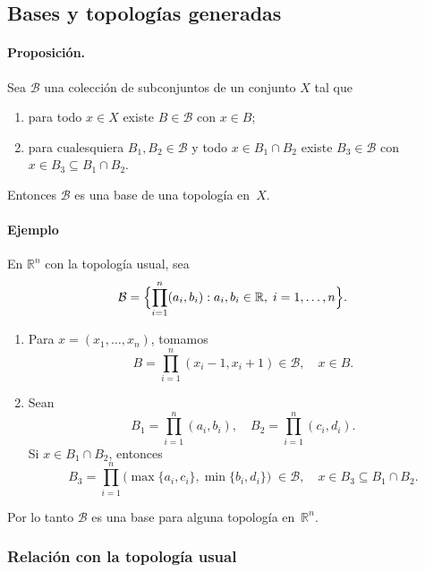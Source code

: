 \subsection{Bases y topologías generadas}

\paragraph{\textbf{Proposición.}}
Sea $\mathcal{B}$ una colección de subconjuntos de un conjunto $X$ tal que
\begin{enumerate}
  \item para todo $x\in X$ existe $B\in\mathcal{B}$ con $x\in B$;
  \item para cualesquiera $B_{1},B_{2}\in\mathcal{B}$ y todo $x\in B_{1}\cap B_{2}$
        existe $B_{3}\in\mathcal{B}$ con $x\in B_{3}\subseteq B_{1}\cap B_{2}$.
\end{enumerate}
Entonces $\mathcal{B}$ es una base de una topología en $X$.

\paragraph{\textbf{Ejemplo}}
En $\mathbb{R}^{n}$ con la topología usual, sea
\[
  \mathcal{B}=
  \Bigl\{
    \prod_{i=1}^{n}(a_{i},b_{i}) : a_{i},b_{i}\in\mathbb{R},\;i=1,\dots,n
  \Bigr\}.
\]
\begin{enumerate}
  \item Para $x=(x_{1},\dots,x_{n})$, tomamos
        \[
          B=\prod_{i=1}^{n}(x_{i}-1,x_{i}+1)\in\mathcal{B},
          \quad x\in B.
        \]
  \item Sean
        \[
          B_{1}=\prod_{i=1}^{n}(a_{i},b_{i}),
          \quad
          B_{2}=\prod_{i=1}^{n}(c_{i},d_{i}).
        \]
        Si $x\in B_{1}\cap B_{2}$, entonces
        \[
          B_{3}=\prod_{i=1}^{n}
                 \bigl(
                   \max\{a_{i},c_{i}\},
                   \min\{b_{i},d_{i}\}
                 \bigr)
          \;\in\mathcal{B},
          \quad x\in B_{3}\subseteq B_{1}\cap B_{2}.
        \]
\end{enumerate}

Por lo tanto $\mathcal{B}$ es una base para alguna topología en $\mathbb R^n$. 
\subsubsection{Relación con la topología usual}

